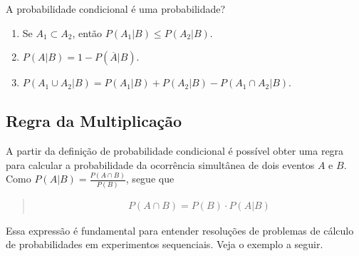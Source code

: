 \begin{example} {A probabilidade condicional é uma probabilidade?}
\begin{enumerate}
\item {} 
Se \(A_1\subset A_2\),  então \(P(A_1|B)\leq P(A_2|B)\).

\item {} 
\(P(A|B)=1-P(\overline{A}|B)\).

\item {} 
\(P(A_1 \cup A_2|B)=P(A_1|B)+P(A_2|B)-P(A_1\cap A_2|B)\).

\end{enumerate}
\end{example}


\subsection{Regra da Multiplicação}

A partir da definição de probabilidade condicional é possível obter uma regra para calcular a probabilidade da ocorrência simultânea de dois eventos \(A\)  e \(B\). Como \(\displaystyle{P(A|B)=\frac{P(A\cap B)}{P(B)}}\), segue que
\begin{quote}
\begin{equation*}
\begin{split}P(A\cap B)=P(B)\cdot P(A|B)\end{split}
\end{equation*}\end{quote}

Essa expressão é fundamental para entender resoluções de problemas de cálculo de probabilidades em experimentos sequenciais. Veja o exemplo a seguir.

